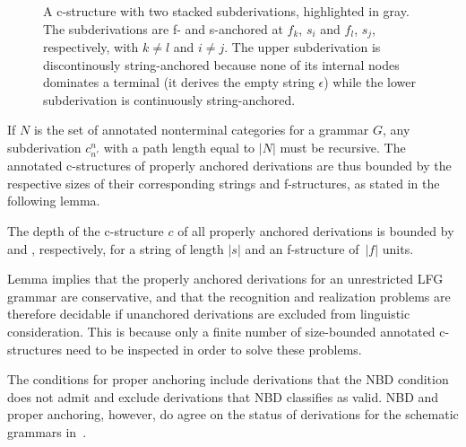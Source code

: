 \documentclass[output=paper,hidelinks]{langscibook}
\begin{document}
\begin{figure}[tb]
{{\begin{tikzpicture}[xscale=0.45,yscale=0.35]
\end{tikzpicture}
\vspace*{-7.0mm}
}
\vspace*{-0mm}}
\caption{A c-structure with two stacked subderivations, highlighted  in gray. The subderivations are f- and s-anchored at \mbox{$f_k$}, \mbox{$s_i$} and \mbox{$f_l$}, \mbox{$s_j$}, respectively, with \mbox{$k\neq l$} and \mbox{$i\neq j$}. The upper subderivation is discontinously string-anchored because none of its internal nodes dominates a terminal (it derives the empty string $\epsilon$) while the lower subderivation is continuously string-anchored.}
 \label{resource}
\vspace*{0.0mm}
 \end{figure}

If $N$ is the set of annotated nonterminal categories for a grammar $G$, any subderivation $c^n_{n'}$ with a path length equal to $|N|$ must be recursive.  The annotated c-structures of properly anchored derivations are thus bounded by the respective sizes of their corresponding strings and f-structures, as stated in the following lemma.

\ea\label{lemma}
{The depth of the c-structure $c$ of all properly anchored derivations  is bounded by  and , respectively, for a string of length $|s|$ and an f-structure of $\,|f|$ units.
}
\z

\noindent Lemma   implies that the properly anchored derivations for an unrestricted LFG grammar are conservative, and that the recognition and realization problems are therefore decidable if unanchored derivations are excluded from linguistic consideration.
This is because only a finite number of size-bounded annotated c-structures need to be inspected in order to solve these problems.

The conditions for proper anchoring include derivations that the NBD condition does not admit and exclude derivations that NBD classifies as valid. NBD and proper anchoring, however, do agree on the status of derivations for the schematic grammars in~. 
\end{document}
